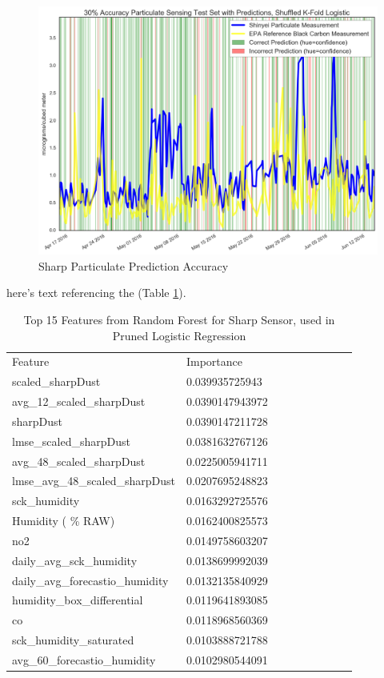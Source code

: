 \begin{figure}[htb]
 	\includegraphics[width=\textwidth]{figs/sharp_goals_30_logistic_predictions}               
 	 \caption{Sharp Particulate Prediction Accuracy}
  	\label{fig:sharp_30_logistic_predictions}
\end{figure}

here's text referencing the (Table \ref{tab:sharp_randomforest_features}).

\begin{table}[H]
\centering
\begin{tabular}{lllllllll}
\\
\\
\toprule
Feature & Importance \\
\midrule
 scaled\_sharpDust &  0.039935725943 \\
 avg\_12\_scaled\_sharpDust &  0.0390147943972 \\
 sharpDust &  0.0390147211728 \\
 lmse\_scaled\_sharpDust &  0.0381632767126 \\
 avg\_48\_scaled\_sharpDust &  0.0225005941711 \\
 lmse\_avg\_48\_scaled\_sharpDust &  0.0207695248823 \\
 sck\_humidity &  0.0163292725576 \\
 Humidity ( \% RAW) &  0.0162400825573 \\
 no2 &  0.0149758603207 \\
 daily\_avg\_sck\_humidity &  0.0138699992039 \\
 daily\_avg\_forecastio\_humidity &  0.0132135840929 \\
 humidity\_box\_differential &  0.0119641893085 \\
 co &  0.0118968560369 \\
 sck\_humidity\_saturated &  0.0103888721788 \\
 avg\_60\_forecastio\_humidity &  0.0102980544091 \\
\bottomrule
\end{tabular}
\label{tab:sharp_randomforest_features}
\caption{Top 15 Features from Random Forest for Sharp Sensor, used in Pruned Logistic Regression}
\end{table}

